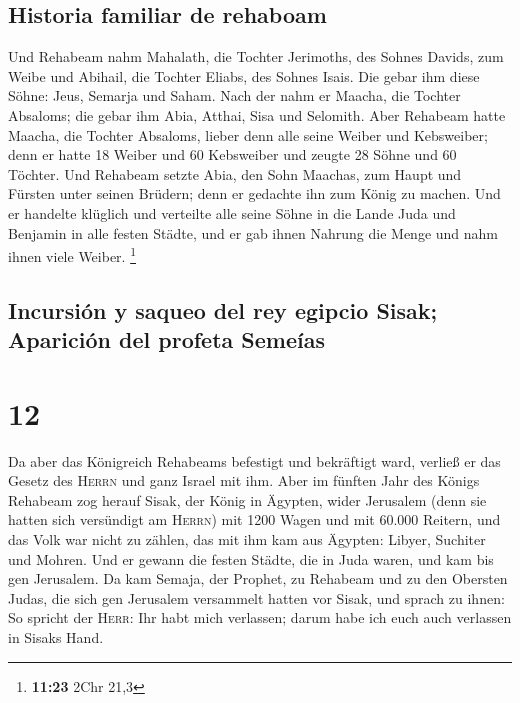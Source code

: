 \hypertarget{historia-familiar-de-rehaboam}{%
\subsection{Historia familiar de
rehaboam}\label{historia-familiar-de-rehaboam}}

 Und Rehabeam nahm Mahalath, die Tochter Jerimoths, des
Sohnes Davids, zum Weibe und Abihail, die Tochter Eliabs, des Sohnes
Isais.  Die gebar ihm diese Söhne: Jeus, Semarja und
Saham.  Nach der nahm er Maacha, die Tochter Absaloms;
die gebar ihm Abia, Atthai, Sisa und Selomith.  Aber
Rehabeam hatte Maacha, die Tochter Absaloms, lieber denn alle seine
Weiber und Kebsweiber; denn er hatte 18 Weiber und 60 Kebsweiber und
zeugte 28 Söhne und 60 Töchter.  Und Rehabeam setzte
Abia, den Sohn Maachas, zum Haupt und Fürsten unter seinen Brüdern; denn
er gedachte ihn zum König zu machen.  Und er handelte
klüglich und verteilte alle seine Söhne in die Lande Juda und Benjamin
in alle festen Städte, und er gab ihnen Nahrung die Menge und nahm ihnen
viele Weiber. \footnote{\textbf{11:23} 2Chr 21,3}

\hypertarget{incursiuxf3n-y-saqueo-del-rey-egipcio-sisak-apariciuxf3n-del-profeta-semeuxedas}{%
\subsection{Incursión y saqueo del rey egipcio Sisak; Aparición del
profeta
Semeías}\label{incursiuxf3n-y-saqueo-del-rey-egipcio-sisak-apariciuxf3n-del-profeta-semeuxedas}}

\hypertarget{section-11}{%
\section{12}\label{section-11}}

 Da aber das Königreich Rehabeams befestigt und bekräftigt
ward, verließ er das Gesetz des \textsc{Herrn} und ganz Israel mit ihm.
 Aber im fünften Jahr des Königs Rehabeam zog herauf
Sisak, der König in Ägypten, wider Jerusalem (denn sie hatten sich
versündigt am \textsc{Herrn})  mit 1200 Wagen und mit
60.000 Reitern, und das Volk war nicht zu zählen, das mit ihm kam aus
Ägypten: Libyer, Suchiter und Mohren.  Und er gewann die
festen Städte, die in Juda waren, und kam bis gen Jerusalem.
 Da kam Semaja, der Prophet, zu Rehabeam und zu den
Obersten Judas, die sich gen Jerusalem versammelt hatten vor Sisak, und
sprach zu ihnen: So spricht der \textsc{Herr}: Ihr habt mich verlassen;
darum habe ich euch auch verlassen in Sisaks Hand.

